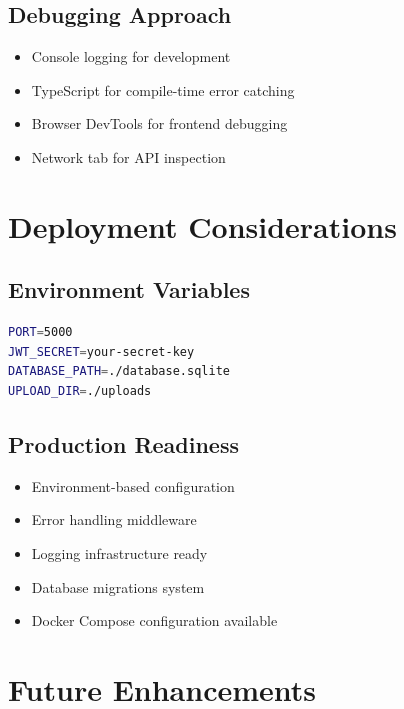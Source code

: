 \documentclass[11pt,a4paper]{article}
\begin{document}
\subsection{Debugging Approach}
\begin{itemize}[leftmargin=*]
    \item Console logging for development
    \item TypeScript for compile-time error catching
    \item Browser DevTools for frontend debugging
    \item Network tab for API inspection
\end{itemize}

\section{Deployment Considerations}

\subsection{Environment Variables}
\begin{lstlisting}[language=bash, caption=Backend .env]
PORT=5000
JWT_SECRET=your-secret-key
DATABASE_PATH=./database.sqlite
UPLOAD_DIR=./uploads
\end{lstlisting}

\subsection{Production Readiness}
\begin{itemize}[leftmargin=*]
    \item Environment-based configuration
    \item Error handling middleware
    \item Logging infrastructure ready
    \item Database migrations system
    \item Docker Compose configuration available
\end{itemize}

\section{Future Enhancements}
\end{document}
